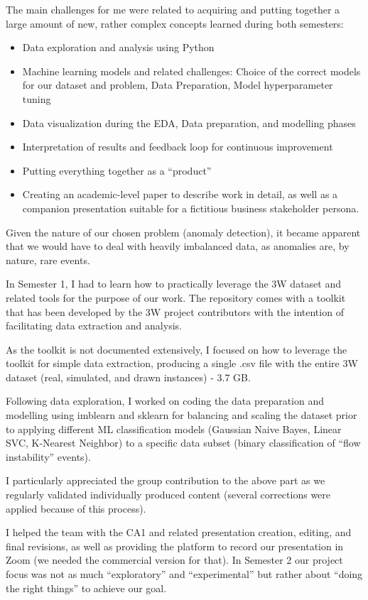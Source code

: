 \documentclass{article}
\begin{document}
The main challenges for me were related to acquiring and putting together a large amount of new, rather complex concepts learned during both semesters:
\begin{itemize}
    \item Data exploration and analysis using Python
    \item Machine learning models and related challenges: Choice of the correct models for our dataset and problem, Data Preparation, Model hyperparameter tuning
    \item Data visualization during the EDA, Data preparation, and modelling phases
    \item Interpretation of results and feedback loop for continuous improvement
    \item Putting everything together as a “product”
    \item Creating an academic-level paper to describe work in detail, as well as a companion presentation suitable for a fictitious business stakeholder persona.    
\end{itemize}

Given the nature of our chosen problem (anomaly detection), it became apparent that we would have to deal with heavily imbalanced data, as anomalies are, by nature, rare events.

In Semester 1, I had to learn how to practically leverage the 3W dataset and related tools for the purpose of our work. The repository comes with a toolkit that has been developed by the 3W project contributors with the intention of facilitating data extraction and analysis.

As the toolkit is not documented extensively, I focused on how to leverage the toolkit for simple data extraction, producing a single .csv file with the entire 3W dataset (real, simulated, and drawn instances) - 3.7 GB.

Following data exploration, I worked on coding the data preparation and modelling using imblearn and sklearn for balancing and scaling the dataset prior to applying different ML classification models (Gaussian Naive Bayes, Linear SVC, K-Nearest Neighbor) to a specific data subset (binary classification of “flow instability” events).

I particularly appreciated the group contribution to the above part as we regularly validated individually produced content (several corrections were applied because of this process).

I helped the team with the CA1 and related presentation creation, editing, and final revisions, as well as providing the platform to record our presentation in Zoom (we needed the commercial version for that).
In Semester 2 our project focus was not as much “exploratory” and “experimental” but rather about “doing the right things” to achieve our goal.
\end{document}
